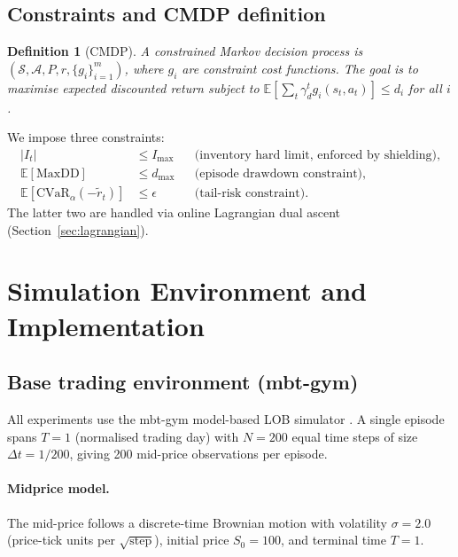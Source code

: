 \documentclass[11pt]{article}
\newcommand{\E}{\mathbb{E}}
\newcommand{\CVaR}{\mathrm{CVaR}}
\newtheorem{definition}{Definition}
\begin{document}
\subsection{Constraints and CMDP definition}

\begin{definition}[CMDP]
A constrained Markov decision process is
$(\mathcal{S}, \mathcal{A}, P, r, \{g_i\}_{i=1}^m)$, where $g_i$ are
constraint cost functions.
The goal is to maximise expected discounted return subject to
$\E[\sum_t \gamma_d^t g_i(s_t, a_t)] \le d_i$ for all $i$.
\end{definition}

We impose three constraints:
\begin{align}
  |I_t| &\le I_{\max}
    && \text{(inventory hard limit, enforced by shielding)}, \\
  \E[\text{MaxDD}] &\le d_{\max}
    && \text{(episode drawdown constraint)}, \\
  \E\!\left[\CVaR_\alpha(-\tilde{r}_t)\right] &\le \epsilon
    && \text{(tail-risk constraint)}.
\end{align}
The latter two are handled via online Lagrangian dual ascent
(Section~\ref{sec:lagrangian}).

\section{Simulation Environment and Implementation}
\label{sec:env}

\subsection{Base trading environment (mbt-gym)}

All experiments use the mbt-gym model-based LOB simulator
\parencite{jerome2023mbtgym}.
A single episode spans $T = 1$ (normalised trading day) with $N = 200$
equal time steps of size $\Delta t = 1/200$, giving 200 mid-price
observations per episode.

\paragraph{Midprice model.}
The mid-price follows a discrete-time Brownian motion with volatility
$\sigma = 2.0$ (price-tick units per $\sqrt{\text{step}}$), initial
price $S_0 = 100$, and terminal time $T = 1$.
\end{document}
